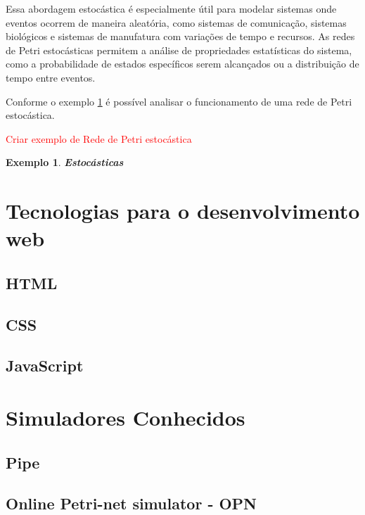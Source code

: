 \documentclass[
	12pt,				%
	openright,			%
	oneside,			%
	a4paper,			%
	english,			%
	brazil				%
	]{abntex2}
\newtheorem{exemplo}{Exemplo}
\begin{document}
Essa abordagem estocástica é especialmente útil para modelar sistemas onde eventos ocorrem de maneira aleatória, como sistemas de comunicação, sistemas biológicos e sistemas de manufatura com variações de tempo e recursos. As redes de Petri estocásticas permitem a análise de propriedades estatísticas do sistema, como a probabilidade de estados específicos serem alcançados ou a distribuição de tempo entre eventos.

Conforme o exemplo \ref{exemplo_estocastica} é possível analisar o funcionamento de uma rede de Petri estocástica.

\textcolor{red}{Criar exemplo de Rede de Petri estocástica}

\begin{exemplo} \textbf{Estocásticas}
\label{exemplo_estocastica}

\end{exemplo}


\section{Tecnologias para o desenvolvimento web}

\subsection*{HTML}

\subsection*{CSS}

\subsection*{JavaScript}

\section{Simuladores Conhecidos}

\subsection*{Pipe}

\subsection*{Online Petri-net simulator - OPN}
\end{document}
